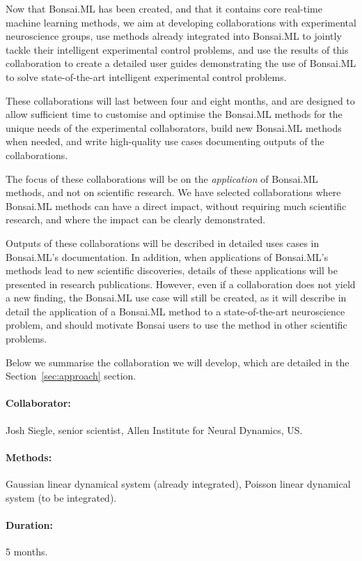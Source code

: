 Now that Bonsai.ML has been created, and that it contains core real-time
machine learning methods, we aim at developing collaborations with experimental
neuroscience groups, use methods already integrated into Bonsai.ML to jointly
tackle their intelligent experimental control problems, and use the results of
this collaboration to create a detailed user guides demonstrating the use of
Bonsai.ML to solve state-of-the-art intelligent experimental control problems.

%
These collaborations will last between four and eight months, and are designed
to allow sufficient time to customise and optimise the Bonsai.ML methods for the
unique needs of the experimental collaborators, build new Bonsai.ML methods when
needed, and write high-quality use cases documenting outputs of the
collaborations.

The focus of these collaborations will be on the \emph{application} of
Bonsai.ML methods, and not on scientific research.
%
We have selected collaborations where Bonsai.ML methods can have a direct impact,
without requiring much scientific research, and where the impact can be clearly
demonstrated.

Outputs of these collaborations will be described in detailed uses cases in
Bonsai.ML's documentation.
%
In addition, when applications of Bonsai.ML's methods lead to new scientific
discoveries, details of these applications will be presented in research
publications.
%
However, even if a collaboration does not yield a new finding, the Bonsai.ML
use case will still be created, as it will describe in detail the application
of a Bonsai.ML method to a state-of-the-art neuroscience problem, and should
motivate Bonsai users to use the method in other scientific problems.

Below we summarise the collaboration we will develop, which are detailed in the
Section~\ref{sec:approach} section.


\paragraph{Collaborator:} Josh Siegle, senior scientist, Allen Institute for
Neural Dynamics, US.

\paragraph{Methods:} Gaussian linear dynamical system (already integrated),
Poisson linear dynamical system (to be integrated).

\paragraph{Duration:} 5 months.
